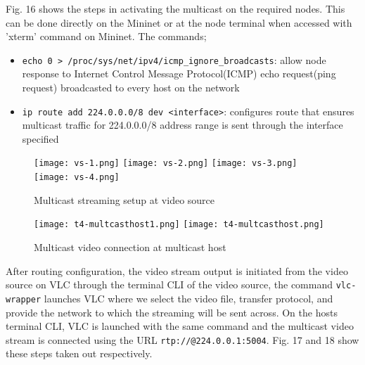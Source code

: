 \documentclass{article}
\begin{document}
\newpage
Fig. 16 shows the steps in activating the multicast on the required nodes. This can be done directly on the Mininet or at the node terminal when accessed with 'xterm' command on Mininet. The commands;
	\begin{itemize}
		\item \texttt{echo 0 > /proc/sys/net/ipv4/icmp\_ignore\_broadcasts}: allow node response to Internet Control Message Protocol(ICMP) echo request(ping request) broadcasted to every host on the network
		\item \texttt{ip route add 224.0.0.0/8 dev <interface>}: configures route that ensures multicast traffic for 224.0.0.0/8 address range is sent through the interface specified
	\end{itemize}
    	\begin{figure}[h]
		\centering
        		\texttt{[image: vs-1.png]}
        		\texttt{[image: vs-2.png]}
        		\texttt{[image: vs-3.png]}
        		\texttt{[image: vs-4.png]}
        		\caption{Multicast streaming setup at video source}
        		\label{fig:t4-2}
    	\end{figure}
	\begin{figure}[h]
		\centering
		\texttt{[image: t4-multcasthost1.png]}
		\texttt{[image: t4-multcasthost.png]}
		\caption{Multicast video connection at multicast host}
		\label{fig:t4-3}
	\end{figure}
After routing configuration, the video stream output is initiated from the video source on VLC through the terminal CLI of the video source, the command \texttt{vlc-wrapper} launches VLC where we select the video file, transfer protocol, and provide the network to which the streaming will be sent across. On the hosts terminal CLI, VLC is launched with the same command and the multicast video stream is connected using the URL \texttt{rtp://@224.0.0.1:5004}. Fig. 17 and 18 show these steps taken out respectively.
\end{document}
